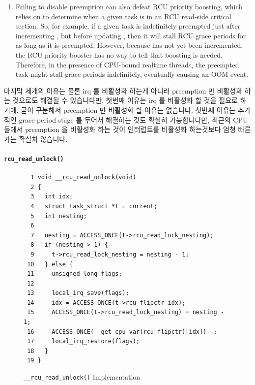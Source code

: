 \begin{enumerate}
\item	Failing to disable preemption can also defeat RCU priority
	boosting, which relies on 
	to determine when a given task is in an RCU read-side
	critical section.
	So, for example, if a given task is indefinitely
	preempted just after incrementing ,
	but before updating ,
	then it will stall RCU grace periods for as long as it
	is preempted.
	However, because  has not
	yet been incremented, the RCU priority booster has no way
	to tell that boosting is needed.
	Therefore, in the presence of CPU-bound realtime threads,
	the preempted task might stall grace periods indefinitely,
	eventually causing an OOM event.
\fi
\end{enumerate}

마지막 세개의 이유는 물론 irq 를 비활성화 하는게 아니라 preemption 만 비활성화
하는 것으로도 해결될 수 있습니다만, 첫번째 이유는 irq 를 비활성화 할 것을
필요로 하기에, 굳이 구분해서 preemption 만 비활성화 할 이유는 없습니다.
첫번째 이유는 추가적인 grace-period stage 를 두어서 해결하는 것도 확실히
가능합니다만, 최근의 CPU 들에서 preemption 을 비활성화 하는 것이 인터럽트를
비활성화 하는것보다 엄청 빠른가는 확실치 않습니다.

\paragraph{{\tt rcu\_read\_unlock()}}
\label{app:rcuimpl:rcu_read_unlock()}

\begin{figure}[tbp]
{ \scriptsize
\begin{verbatim}
  1 void __rcu_read_unlock(void)
  2 {
  3   int idx;
  4   struct task_struct *t = current;
  5   int nesting;
  6
  7   nesting = ACCESS_ONCE(t->rcu_read_lock_nesting);
  8   if (nesting > 1) {
  9     t->rcu_read_lock_nesting = nesting - 1;
 10   } else {
 11     unsigned long flags;
 12
 13     local_irq_save(flags);
 14     idx = ACCESS_ONCE(t->rcu_flipctr_idx);
 15     ACCESS_ONCE(t->rcu_read_lock_nesting) = nesting - 1;
 16     ACCESS_ONCE(__get_cpu_var(rcu_flipctr)[idx])--;
 17     local_irq_restore(flags);
 18   }
 19 }
\end{verbatim}
}
\caption{{\tt \_\_rcu\_read\_unlock()} Implementation}
\label{fig:app:rcuimpl:__rcu_read_unlock() Implementation}
\end{figure}

